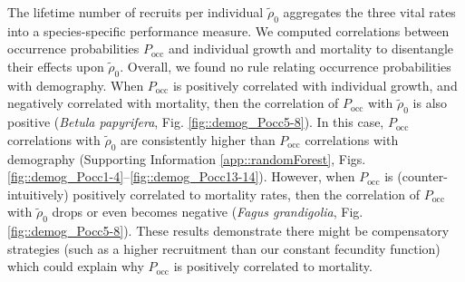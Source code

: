 The lifetime number of recruits per individual $ \tilde \rho_0 $ aggregates the three vital rates into a species-specific performance measure. We computed correlations between occurrence probabilities $ P_{\text{occ}} $ and individual growth and mortality to disentangle their effects upon $ \tilde \rho_0 $. Overall, we found no rule relating occurrence probabilities with demography. When $ P_{\text{occ}} $ is positively correlated with individual growth, and negatively correlated with mortality, then the correlation of $ P_{\text{occ}} $ with $ \tilde \rho_0 $ is also positive (\eg \textit{Betula papyrifera}, Fig. \ref{fig::demog_Pocc5-8}). In this case, $ P_{\text{occ}} $ correlations with $ \tilde \rho_0 $ are consistently higher than $ P_{\text{occ}} $ correlations with demography (Supporting Information \ref{app::randomForest}, Figs. \ref{fig::demog_Pocc1-4}--\ref{fig::demog_Pocc13-14}). However, when $ P_{\text{occ}} $ is (counter-intuitively) positively correlated to mortality rates, then the correlation of $ P_{\text{occ}} $ with $ \tilde \rho_0 $ drops or even becomes negative (\eg \textit{Fagus grandigolia}, Fig. \ref{fig::demog_Pocc5-8}). These results demonstrate there might be compensatory strategies (such as a higher recruitment than our constant fecundity function) which could explain why $ P_{\text{occ}} $ is positively correlated to mortality.
